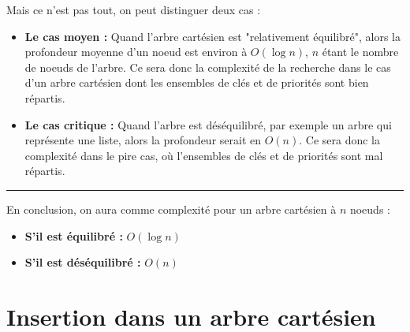 \documentclass[a4paper,12pt]{report}
\begin{document}
\begin{tcolorbox}[colback=gray!10, colframe=blue!30, coltitle=black, title=Réponse à la 2.b - 2/2]

    Mais ce n'est pas tout, on peut distinguer deux cas :
    \begin{itemize}
        \item \textbf{Le cas moyen :} Quand l'arbre cartésien est "relativement équilibré", alors la profondeur moyenne d'un noeud est environ à 
            \( O(\log n) \), \( n \) étant le nombre de noeuds de l'arbre. Ce sera donc la complexité de la recherche dans le cas d'un arbre cartésien 
            dont les ensembles de clés et de priorités sont bien répartis.

        \item \textbf{Le cas critique :} Quand l'arbre est déséquilibré, par exemple un arbre qui représente une liste, alors la profondeur serait en 
            \( O(n) \). Ce sera donc la complexité dans le pire cas, où l'ensembles de clés et de priorités sont mal répartis.
    \end{itemize}

    \vspace{0.5cm}
    \hrule
    \vspace{0.5cm}

    En conclusion, on aura comme complexité pour un arbre cartésien à \( n \) noeuds :
    \begin{itemize}
        \item \textbf{S'il est équilibré :} \( O(\log n) \)
        \item \textbf{S'il est déséquilibré :} \( O(n) \)
    \end{itemize}

\end{tcolorbox}






\newpage

\renewcommand{\chaptername}{Exercice}
\chapter{Insertion dans un arbre cartésien}



\end{document}
